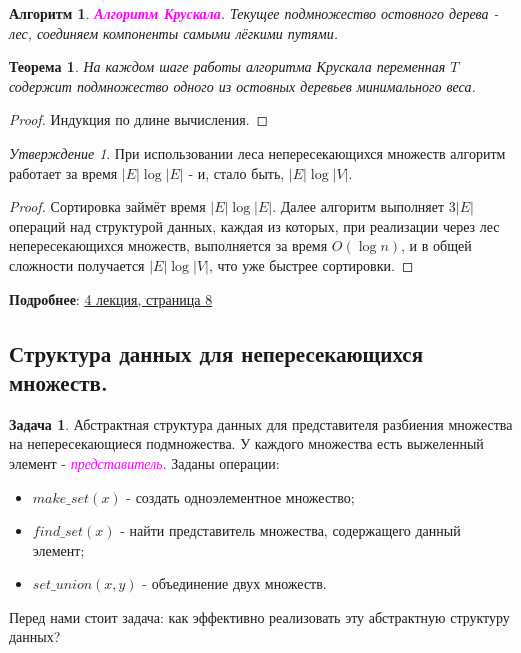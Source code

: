 \documentclass[a4paper]{article}
\theoremstyle{indented}
\newtheorem{theorem}{Теорема}
\newtheorem{alg}{Алгоритм}
\theoremstyle{definition}
\newtheorem{prob}{Задача}
\theoremstyle{remark}
\newtheorem{stat}{Утверждение}
\begin{document}
\begin{alg}
    \textcolor{magenta}{\hypertarget{t19}{\textbf{Алгоритм Крускала}}}. Текущее подмножество остовного дерева - лес, соединяем компоненты самыми лёгкими путями.
\end{alg}

\begin{theorem}
    На каждом шаге работы алгоритма Крускала переменная $T$ содержит подмножество одного из остовных деревьев минимального веса.
\end{theorem}

\begin{proof}
    Индукция по длине вычисления.
\end{proof}

\begin{stat}
    При использовании леса непересекающихся множеств алгоритм работает за время $|E|\log |E|$ - и, стало быть, $|E|\log |V|$. 
\end{stat}

\begin{proof}
    Сортировка займёт время $|E|\log |E|$. Далее алгоритм выполняет $3|E|$ операций над структурой данных, каждая из которых, при реализации через лес непересекающихся множеств, выполняется за время $O(\log n)$, и в общей сложности получается $|E|\log |V|$, что уже быстрее сортировки.
\end{proof}

\textbf{Подробнее}: \href{https://users.math-cs.spbu.ru/~okhotin/teaching/algorithms_2020/okhotin_algorithms_2020_l4.pdf}{4 лекция, страница 8} 

\subsection{Структура данных для непересекающихся множеств.}

\begin{prob}
    Абстрактная структура данных для представителя разбиения множества на непересекающиеся подмножества. У каждого множества есть выжеленный элемент - \textcolor{magenta}{\hypertarget{d7}{\textit{представитель}}}. Заданы операции:

    \begin{itemize}
        \item $make\_set(x)$ - создать одноэлементное множество; 
        \item $find\_set(x)$ - найти представитель множества, содержащего данный элемент; 
        \item $set\_union(x, y)$ - объединение двух множеств.
    \end{itemize}

    Перед нами стоит задача: как эффективно реализовать эту абстрактную структуру данных?
\end{prob}
\end{document}
